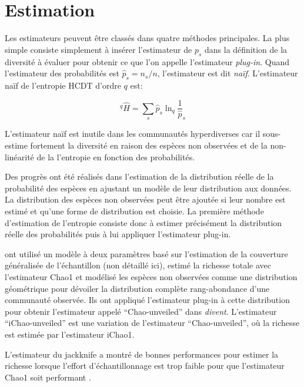 \documentclass[
  11pt,
  american,
  a4paper,
  extrafontsizes,onecolumn,openright
  ]{memoir}
\newlength{\rf}
\begin{document}
\section{Estimation}\label{estimation-2}

Les estimateurs peuvent être classés dans quatre méthodes principales.
La plus simple consiste simplement à insérer l'estimateur de \(p_s\) dans la définition de la diversité à évaluer pour obtenir ce que l'on appelle l'estimateur \emph{plug-in}.
Quand l'estimateur des probabilités est \(\hat{p}_s = n_s/n\), l'estimateur est dit \emph{naïf}.
L'estimateur naïf de l'entropie HCDT d'ordre \(q\) est:

\begin{equation}
  ^{q}{\hat{H}} = \sum_{s}{{\hat{p}}_s \ln_q{\frac{1}{\hat{p}}_s}}
  \label{eq:Hplugin}
\end{equation}

L'estimateur naïf est inutile dans les communautés hyperdiverses car il sous-estime fortement la diversité en raison des espèces non observées et de la non-linéarité de la l'entropie en fonction des probabilités.

Des progrès ont été réalisés dans l'estimation de la distribution réelle de la probabilité des espèces en ajustant un modèle de leur distribution aux données.
La distribution des espèces non observées peut être ajoutée si leur nombre est estimé et qu'une forme de distribution est choisie.
La première méthode d'estimation de l'entropie consiste donc à estimer précisément la distribution réelle des probabilités puis à lui appliquer l'estimateur plug-in.

\textcite{Chao2014c} ont utilisé un modèle à deux paramètres basé sur l'estimation de la couverture généralisée de l'échantillon (non détaillé ici), estimé la richesse totale avec l'estimateur Chao1 et modélisé les espèces non observées comme une distribution géométrique pour dévoiler la distribution complète rang-abondance d'une communauté observée.
Ils ont appliqué l'estimateur plug-in à cette distribution pour obtenir l'estimateur appelé \enquote{Chao-unveiled} dans \emph{divent}.
L'estimateur \enquote{iChao-unveiled} est une variation de l'estimateur \enquote{Chao-unveiled}, où la richesse est estimée par l'estimateur iChao1.

L'estimateur du jackknife \autocite{Burnham1979} a montré de bonnes performances pour estimer la richesse lorsque l'effort d'échantillonnage est trop faible pour que l'estimateur Chao1 soit performant \autocite{Brose2003}.
\end{document}
